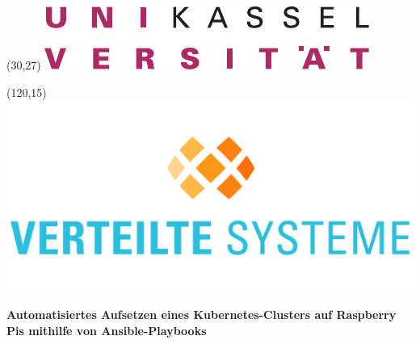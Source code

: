 \begin{titlepage}
\newcommand{\Titel}[2][\textwidth]{\renewcommand{\baselinestretch}{1.0}\hfil
            \parbox{#1}{\huge\bfseries\centering #2}\hfil\par}
\renewcommand{\subtitle}[2][\textwidth]{\renewcommand{\baselinestretch}{1.0}\hfil
            \parbox{#1}{\LARGE\centering\mbox{}\llap{--~}#2\rlap{~--}}\hfil\par}
\newcommand{\addLine}[2][\textwidth]{\renewcommand{\baselinestretch}{1.0}\hfil
            \parbox{#1}{\large\centering #2}\hfil\par}


\begin{textblock}{40}(30,27)
 \includegraphics[scale=0.7]{img/unilogo.pdf}
\end{textblock}

\begin{textblock}{40}(120,15)
 \includegraphics[scale=0.07]{img/vs-color.pdf}
\end{textblock}

\addLine{}
\vspace{0.2\textheight}

\Titel{Automatisiertes Aufsetzen eines Kubernetes-Clusters auf Raspberry Pis mithilfe von Ansible-Playbooks}

\newcommand*{\student}{KL}
\newcommand*{\matrikelnummer}{-}
\newcommand*{\betreuerA}{HB}
\newcommand*{\betreuerB}{RH}


\end{titlepage}
